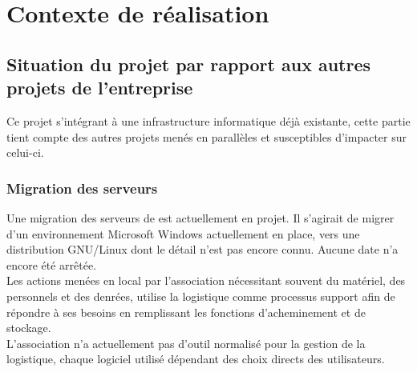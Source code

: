 \section{Contexte de réalisation}

\subsection{Situation du projet par rapport aux autres projets de l'entreprise}
Ce projet s'intégrant à une infrastructure informatique déjà existante, cette partie tient compte des autres projets menés en parallèles et susceptibles d'impacter sur celui-ci.

\subsubsection{Migration des serveurs}
Une migration des serveurs de \mo est actuellement en projet. Il s'agirait de migrer d'un environnement Microsoft Windows actuellement en place, vers une distribution GNU/Linux dont le détail n'est pas encore connu. Aucune date n'a encore été arrêtée.
\\
Les actions menées en local par l'association nécessitant souvent du matériel, des personnels et des denrées,  utilise la logistique comme processus support afin de répondre à ses besoins en remplissant les fonctions d'acheminement et de stockage.
\\
L'association n'a actuellement pas d'outil normalisé pour la gestion de la logistique, chaque logiciel utilisé dépendant des choix directs des utilisateurs.


